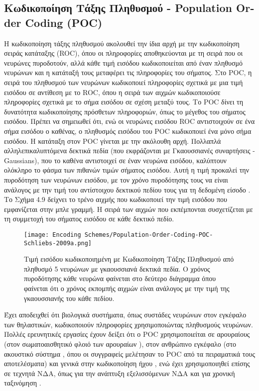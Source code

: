 \documentclass[12pt]{report}
\begin{document}
\subsection{Κωδικοποίηση Τάξης Πληθυσμού - \textlatin{Population Order Coding (POC)}}

Η κωδικοποίηση τάξης πληθυσμού ακολουθεί την ίδια αρχή με την κωδικοποίηση σειράς κατάταξης (\textlatin{ROC}), όπου οι πληροφορίες αποθηκεύονται με τη σειρά που οι νευρώνες πυροδοτούν, αλλά κάθε τιμή εισόδου κωδικοποιείται από έναν πληθυσμό νευρώνων και η κατάταξή τους μεταφέρει τις πληροφορίες του σήματος. Στο \textlatin{POC}, η σειρά του πληθυσμού των νευρώνων κωδικοποιεί πληροφορίες σχετικά με μια τιμή εισόδου σε αντίθεση με το \textlatin{ROC}, όπου η σειρά των αιχμών κωδικοποιούσε πληροφορίες σχετικά με το σήμα εισόδου σε σχέση μεταξύ τους. Το \textlatin{POC} δίνει τη δυνατότητα κωδικοποίησης πρόσθετων πληροφοριών, όπως το μέγεθος του σήματος εισόδου. Πρέπει να σημειωθεί ότι, ενώ οι νευρώνες εισόδου \textlatin{ROC} αντιστοιχούν σε ένα σήμα εισόδου ο καθένας, ο πληθυσμός εισόδου του \textlatin{POC} κωδικοποιεί ένα μόνο σήμα εισόδου. Η κατάταξη στον \textlatin{POC} γίνεται με την ακόλουθη αρχή. Πολλαπλά αλληλεπικαλυπτόμενα δεκτικά πεδία (που εκφράζονται με Γκαουσσιανές συναρτήσεις - \textlatin{Gaussians}), που το καθένα αντιστοιχεί σε έναν νευρώνα εισόδου, καλύπτουν ολόκληρο το φάσμα των πιθανών τιμών σήματος εισόδου. Αυτή η τιμή προκαλεί την πυροδότηση των νευρώνων εισόδου, με τον χρόνο πυροδότησης τους να είναι ανάλογος με την τιμή του αντίστοιχου δεκτικού πεδίου τους για τη δεδομένη είσοδο \cite{Kasabov2018}. Το Σχήμα 4.9 δείχνει το τρένο αιχμής που κωδικοποιεί την τιμή εισόδου που εμφανίζεται στην μπλε γραμμή. Η σειρά των αιχμών που εκπέμπονται συσχετίζεται με τη συμμετοχή του σήματος εισόδου σε κάθε δεκτικό πεδίο.

\begin{figure}[htp]
    \centering
    \texttt{[image: Encoding Schemes/Population-Order-Coding-POC-Schliebs-2009a.png]}
    \caption{Τιμή εισόδου κωδικοποιημένη με Κωδικοποίηση Τάξης Πληθυσμού από πληθυσμό 5 νευρώνων με γκαουσσιανά δεκτικά πεδία. Ο χρόνος πυροδότησης κάθε νευρώνα φαίνεται στο δεύτερο διάγραμμα όπου φαίνεται ότι ο χρόνος εκπομπής αιχμών είναι ανάλογος με την τιμή της γκαουσσιανής του κάθε πεδίου.}
    \label{fig:spikeprop-net-architecture}
\end{figure}

Έχει αποδειχθεί ότι βιολογικά συστήματα, όπως συστάδες νευρώνων στον εγκέφαλο των θηλαστικών, κωδικοποιούν πληροφορίες χρησιμοποιώντας πληθυσμούς νευρώνων. Πολλές ερευνητικές εργασίες έχουν δείξει ότι ο \textlatin{POC} χρησιμοποιείται σε αρουραίους (στον σωματοαισθητικό φλοιό των αρουραίων \cite{Petersen2001}), στον ανθρώπινο εγκέφαλο (στο ακουστικό σύστημα \cite{Onken2014}, όπου οι συγγραφείς μελέτησαν το \textlatin{POC} από τα πειραματικά τους αποτελέσματα) και γενικά στην κωδικοποίηση ήχου \cite{Dean2005}, ενώ έχει χρησιμοποιηθεί επίσης σε τεχνητά ΝΔΑ, όπως για την ανάπτυξη εξελισσόμενων ΝΔΑ \cite{Soltic2010} και για χρονική ταξινόμηση \cite{Pan2019}.
\end{document}
